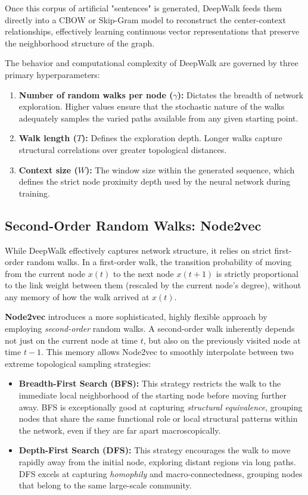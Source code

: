 Once this corpus of artificial "sentences" is generated, DeepWalk feeds them directly into a CBOW or Skip-Gram model to reconstruct the center-context relationships, effectively learning continuous vector representations that preserve the neighborhood structure of the graph.

The behavior and computational complexity of DeepWalk are governed by three primary hyperparameters:
\begin{enumerate}
    \item \textbf{Number of random walks per node ($\gamma$):} Dictates the breadth of network exploration. Higher values ensure that the stochastic nature of the walks adequately samples the varied paths available from any given starting point.
    \item \textbf{Walk length ($T$):} Defines the exploration depth. Longer walks capture structural correlations over greater topological distances.
    \item \textbf{Context size ($W$):} The window size within the generated sequence, which defines the strict node proximity depth used by the neural network during training.
\end{enumerate}

\subsection{Second-Order Random Walks: Node2vec}
\label{subsec:node2vec}

While DeepWalk effectively captures network structure, it relies on strict first-order random walks. In a first-order walk, the transition probability of moving from the current node $x(t)$ to the next node $x(t+1)$ is strictly proportional to the link weight between them (rescaled by the current node's degree), without any memory of how the walk arrived at $x(t)$.

\textbf{Node2vec} introduces a more sophisticated, highly flexible approach by employing \textit{second-order} random walks. A second-order walk inherently depends not just on the current node at time $t$, but also on the previously visited node at time $t-1$. This memory allows Node2vec to smoothly interpolate between two extreme topological sampling strategies:

\begin{itemize}
    \item \textbf{Breadth-First Search (BFS):} This strategy restricts the walk to the immediate local neighborhood of the starting node before moving further away. BFS is exceptionally good at capturing \textit{structural equivalence}, grouping nodes that share the same functional role or local structural patterns within the network, even if they are far apart macroscopically.
    \item \textbf{Depth-First Search (DFS):} This strategy encourages the walk to move rapidly away from the initial node, exploring distant regions via long paths. DFS excels at capturing \textit{homophily} and macro-connectedness, grouping nodes that belong to the same large-scale community.
\end{itemize}


